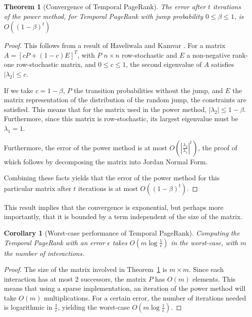 \documentclass[a4paper,11pt]{book}
\newcommand{\eps}{\epsilon}
\newtheorem{theorem}{Theorem}
\newtheorem*{corollary}{Corollary}
\theoremstyle{definition}
\begin{document}
\begin{theorem}[Convergence of Temporal PageRank]
    The error after $t$ iterations of the power method, for Temporal PageRank with
    jump probability $0 \leq \beta \leq 1$, is $O((1-\beta)^t)$
    \label{thm:conv_tpr}
\end{theorem}

\begin{proof}
    This follows from a result of Haveliwala and Kamvar \cite{haveliwala2003second}.
    For a matrix $A = [cP + (1-c)E]^T$, with $P$ $n \times n$ row-stochastic
    and $E$ a non-negative rank-one row-stochastic matrix, and $0 \leq c \leq 1$, the
    second eigenvalue of $A$ satisfies $|\lambda_2| \leq c$. 

    If we take $c=1-\beta$, $P$ the transition probabilities without the jump, and $E$ the
    matrix representation of the distribution of the random jump, the constraints are satisfied.
    This means that for the matrix used in the power method, $|\lambda_2| \leq 1-\beta$.
    Furthermore, since this matrix is row-stochastic, its largest eigenvalue must be $\lambda_1=1$.

    Furthermore, the error of the power method is at most $O\left(\left|\frac{\lambda_2}{\lambda_1}\right|^t\right)$,
    the proof of which follows by decomposing the matrix into Jordan Normal Form.

    Combining these facts yields that the error of the power method for this particular matrix
    after $t$ iterations is at most $O( (1-\beta)^t)$.
\end{proof}

This result implies that the convergence is exponential, but perhaps more importantly, that it is bounded
by a term independent of the size of the matrix. 

\begin{corollary}[Worst-case performance of Temporal PageRank]
    Computing the Temporal PageRank with an error $\eps$ takes $O(m\log\frac1\eps)$ in the worst-case,
    with $m$ the number of interactions.
\end{corollary}
\begin{proof}
    The size of the matrix involved in Theorem~\ref{thm:conv_tpr} is $m \times m$. Since each interaction
    has at most 2 successors, the matrix $P$ has $O(m)$ elements. This means that using a sparse implementation,
    an iteration of the power method will take $O(m)$ multiplications. For a certain error, the number of
    iterations needed is logarithmic in $\frac1\eps$, yielding the worst-case $O(m\log\frac1\eps)$.
\end{proof}
\end{document}
